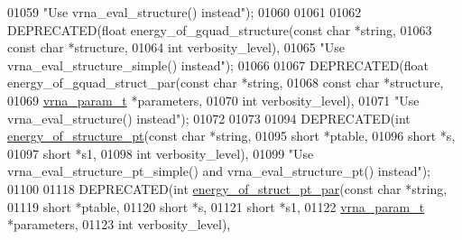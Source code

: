 \begin{DoxyCode}
01059            \textcolor{stringliteral}{"Use vrna\_eval\_structure() instead"});
01060 
01061 
01062 DEPRECATED(\textcolor{keywordtype}{float} energy\_of\_gquad\_structure(\textcolor{keyword}{const} \textcolor{keywordtype}{char} *\textcolor{keywordtype}{string},
01063                                            \textcolor{keyword}{const} \textcolor{keywordtype}{char} *structure,
01064                                            \textcolor{keywordtype}{int}        verbosity\_level),
01065            \textcolor{stringliteral}{"Use vrna\_eval\_structure\_simple() instead"});
01066 
01067 DEPRECATED(\textcolor{keywordtype}{float} energy\_of\_gquad\_struct\_par(\textcolor{keyword}{const} \textcolor{keywordtype}{char}    *\textcolor{keywordtype}{string},
01068                                             \textcolor{keyword}{const} \textcolor{keywordtype}{char}    *structure,
01069                                             \hyperlink{group__energy__parameters_structvrna__param__s}{vrna\_param\_t}  *parameters,
01070                                             \textcolor{keywordtype}{int}           verbosity\_level),
01071            \textcolor{stringliteral}{"Use vrna\_eval\_structure() instead"});
01072 
01073 
01094 DEPRECATED(\textcolor{keywordtype}{int} \hyperlink{group__eval__deprecated_ga8831445966b761417e713360791299d8}{energy\_of\_structure\_pt}(\textcolor{keyword}{const} \textcolor{keywordtype}{char}  *\textcolor{keywordtype}{string},
01095                                       \textcolor{keywordtype}{short}       *ptable,
01096                                       \textcolor{keywordtype}{short}       *s,
01097                                       \textcolor{keywordtype}{short}       *s1,
01098                                       \textcolor{keywordtype}{int}         verbosity\_level),
01099            \textcolor{stringliteral}{"Use vrna\_eval\_structure\_pt\_simple() and vrna\_eval\_structure\_pt() instead"});
01100 
01118 DEPRECATED(\textcolor{keywordtype}{int} \hyperlink{group__eval__deprecated_ga49acb3d5627dc6823a7ce12d116d4c69}{energy\_of\_struct\_pt\_par}(\textcolor{keyword}{const} \textcolor{keywordtype}{char}   *\textcolor{keywordtype}{string},
01119                                        \textcolor{keywordtype}{short}        *ptable,
01120                                        \textcolor{keywordtype}{short}        *s,
01121                                        \textcolor{keywordtype}{short}        *s1,
01122                                        \hyperlink{group__energy__parameters_structvrna__param__s}{vrna\_param\_t} *parameters,
01123                                        \textcolor{keywordtype}{int}          verbosity\_level),

\end{DoxyCode}
